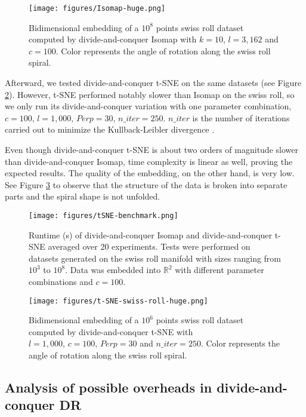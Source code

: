 \begin{figure}
    \centering
    \texttt{[image: figures/Isomap-huge.png]}
    \caption{Bidimensional embedding of a $10^8$ points swiss roll dataset \citep{Spiwokv2007} computed by divide-and-conquer Isomap with $k=10, \, l=3,162$ and $c=100$. Color represents the angle of rotation along the swiss roll spiral.}
    \label{fig:Isomap-huge}
\end{figure}

Afterward, we tested divide-and-conquer t-SNE on the same datasets (see Figure \ref{fig:t-SNE-benchmark}). However, t-SNE performed notably slower than Isomap on the swiss roll, so we only run its divide-and-conquer variation with one parameter combination, $c = 100, \, l=1,000, \, Perp=30, \, n\_iter=250$. $n\_iter$ is the number of iterations carried out to minimize the Kullback-Leibler divergence \citep{Kullback1951}.

Even though divide-and-conquer t-SNE is about two orders of magnitude slower than divide-and-conquer Isomap, time complexity is linear as well, proving the expected results. The quality of the embedding, on the other hand, is very low. See Figure \ref{fig:t-SNE-huge} to observe that the structure of the data is broken into separate parts and the spiral shape is not unfolded.

\begin{figure}
    \centering
    \texttt{[image: figures/tSNE-benchmark.png]}
    \caption{Runtime (s) of divide-and-conquer Isomap and divide-and-conquer t-SNE averaged over 20 experiments. Tests were performed on datasets generated on the swiss roll manifold \citep{Spiwokv2007} with sizes ranging from $10^3$ to $10^8$. Data was embedded into $\mathbb{R}^2$ with different parameter combinations and $c=100$.}
    \label{fig:t-SNE-benchmark}
\end{figure}

\begin{figure}
    \centering
    \texttt{[image: figures/t-SNE-swiss-roll-huge.png]}
    \caption{Bidimensional embedding of a $10^6$ points swiss roll dataset \citep{Spiwokv2007} computed by divide-and-conquer t-SNE with $l=1,000, \, c=100, \, Perp=30$ and $n\_iter=250$. Color represents the angle of rotation along the swiss roll spiral.}
    \label{fig:t-SNE-huge}
\end{figure}

\subsection{Analysis of possible overheads in divide-and-conquer DR}

